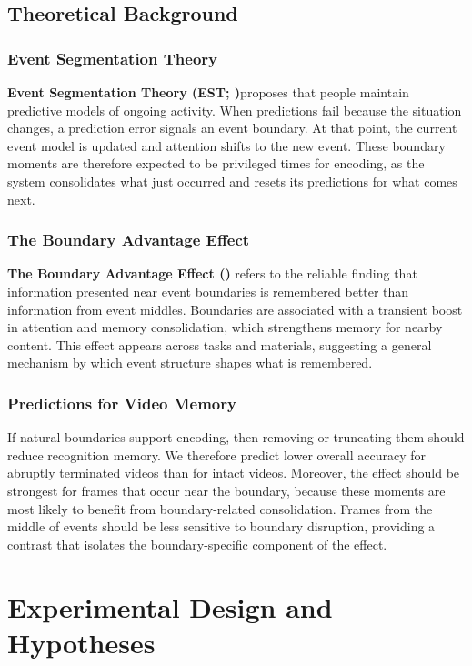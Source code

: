 \documentclass[11pt]{article}
\begin{document}
\subsection{Theoretical Background}
\subsubsection{Event Segmentation Theory}
\textbf{Event Segmentation Theory (EST; \cite{zacks2007})}proposes that people maintain predictive models of ongoing activity. When predictions fail because the situation changes, a prediction error signals an event boundary. At that point, the current event model is updated and attention shifts to the new event. These boundary moments are therefore expected to be privileged times for encoding, as the system consolidates what just occurred and resets its predictions for what comes next.

\subsubsection{The Boundary Advantage Effect}
\textbf{The Boundary Advantage Effect (\cite{swallow2009})} refers to the reliable finding that information presented near event boundaries is remembered better than information from event middles. Boundaries are associated with a transient boost in attention and memory consolidation, which strengthens memory for nearby content. This effect appears across tasks and materials, suggesting a general mechanism by which event structure shapes what is remembered.

\subsubsection{Predictions for Video Memory}
If natural boundaries support encoding, then removing or truncating them should reduce recognition memory. We therefore predict lower overall accuracy for abruptly terminated videos than for intact videos. Moreover, the effect should be strongest for frames that occur near the boundary, because these moments are most likely to benefit from boundary-related consolidation. Frames from the middle of events should be less sensitive to boundary disruption, providing a contrast that isolates the boundary-specific component of the effect.

\section{Experimental Design and Hypotheses}
\end{document}
